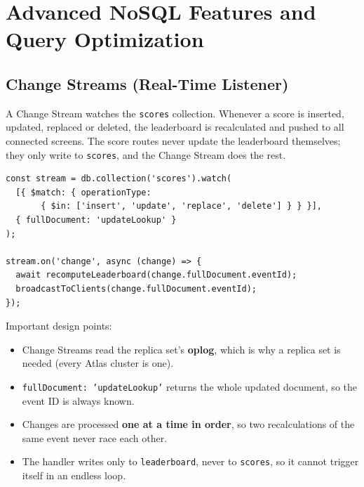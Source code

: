 \documentclass[11pt,a4paper]{article}
\begin{document}
\section{Advanced NoSQL Features and Query Optimization}

\subsection{Change Streams (Real-Time Listener)}
A Change Stream watches the \texttt{scores} collection. Whenever a score is inserted, updated, replaced or deleted, the leaderboard is recalculated and pushed to all connected screens. The score routes never update the leaderboard themselves; they only write to \texttt{scores}, and the Change Stream does the rest.
\begin{lstlisting}
const stream = db.collection('scores').watch(
  [{ $match: { operationType:
       { $in: ['insert', 'update', 'replace', 'delete'] } } }],
  { fullDocument: 'updateLookup' }
);

stream.on('change', async (change) => {
  await recomputeLeaderboard(change.fullDocument.eventId);
  broadcastToClients(change.fullDocument.eventId);
});
\end{lstlisting}

Important design points:
\begin{itemize}
  \item Change Streams read the replica set's \textbf{oplog}, which is why a replica set is needed (every Atlas cluster is one).
  \item \texttt{fullDocument: 'updateLookup'} returns the whole updated document, so the event ID is always known.
  \item Changes are processed \textbf{one at a time in order}, so two recalculations of the same event never race each other.
  \item The handler writes only to \texttt{leaderboard}, never to \texttt{scores}, so it cannot trigger itself in an endless loop.
\end{itemize}
\end{document}
